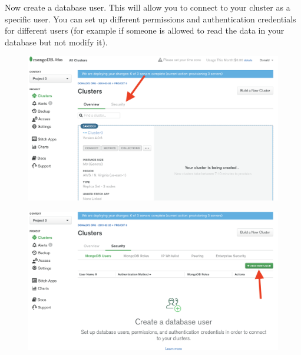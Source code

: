 \documentclass{42-en}
\begin{document}
\newpage
Now create a database user. This will allow you to connect to your cluster as a specific user. You can set up different permissions and authentication credentials for different users (for example if someone is allowed to read the data in your database but not modify it).
\begin{figure}[H]
    \begin{center}
        \includegraphics[width=14cm]{WEB/mongo_4.png}
    \end{center}
\end{figure}

\begin{figure}[H]
    \begin{center}
        \includegraphics[width=14cm]{WEB/mongo_5.png}
    \end{center}
\end{figure}
\end{document}
